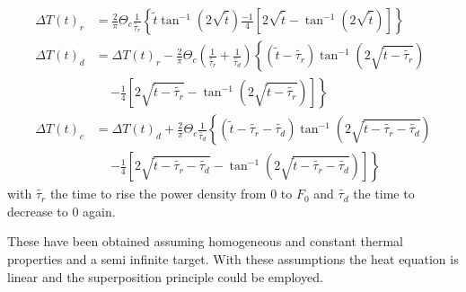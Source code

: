 \begin{itemize}


\begin{equation}
\label{eq:triang}
\begin{aligned}
{\Delta T(t)}_r &= \frac{2}{\pi} {\Theta}_c \frac{1}{\tilde{\tau_r}}   \left\{ {\tilde{t}} \tan^{ -1}(2 \sqrt{ \tilde{t}} )  \frac{-1}{4} [ 2 \sqrt{ \tilde{t}} - \tan^{ -1}(2 \sqrt{ \tilde{t}} ) ] \right\}
\\ 
{\Delta T(t)}_d &= {\Delta T(t)}_r - \frac{2}{\pi} {\Theta}_c \left( \frac{1}{\tilde{\tau_r}} +\frac{1}{\tilde{\tau_d}}  \right) \left\{ {(\tilde{t} - \tilde{\tau_r})} \tan^{ -1} (2 \sqrt{ \tilde{t} - \tilde{\tau_r}} )  \right. 
\\
& \phantom{+} \left. - \frac{1}{4 } [ 2 \sqrt{ \tilde{t} - \tilde{\tau_r}} - \tan^{ -1}(2 \sqrt{ \tilde{t} - \tilde{\tau_r}} ) ] \right\} 
\\ 
{\Delta T(t)}_c &= {\Delta T(t)}_d + \frac{2}{\pi} {\Theta}_c \frac{1}{\tilde{\tau_d}} \left\{ {(\tilde{t} - \tilde{\tau_r} - \tilde{\tau_d})} \tan^{ -1}(2 \sqrt{ \tilde{t} - \tilde{\tau_r} - \tilde{\tau_d}} ) \right. 
\\
& \phantom{+} \left. - \frac{1}{4 } [ 2 \sqrt{ \tilde{t} - \tilde{\tau_r} - \tilde{\tau_d}} - \tan^{ -1}(2 \sqrt{ \tilde{t} - \tilde{\tau_r} - \tilde{\tau_d}} ) ] \right\}
\end{aligned}
\end{equation}
with $\tilde{\tau_r}$ the time to rise the power density from $0$ to $F_0$ and $\tilde{\tau_d}$ the time to decrease to $0$ again.

\end{itemize}
These have been obtained assuming homogeneous and constant thermal properties and a semi infinite target. With these assumptions the heat equation is linear and the superposition principle could be employed.

